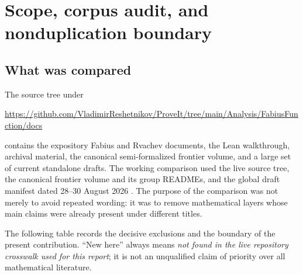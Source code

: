 \documentclass[11pt,a4paper]{article}
\theoremstyle{definition}
\newcommand{\1}{\mathbf{1}}
\begin{document}
\tableofcontents
\newpage

\section{Scope, corpus audit, and nonduplication boundary}
\label{sec:audit}

\subsection{What was compared}

The source tree under
\begin{center}
\url{https://github.com/VladimirReshetnikov/ProveIt/tree/main/Analysis/FabiusFunction/docs}
\end{center}
contains the expository Fabius and Rvachev documents, the Lean walkthrough,
archival material, the canonical semi-formalized frontier volume, and a large
set of current standalone drafts.  The working comparison used the live
source tree, the canonical frontier volume and its group READMEs, and the
global draft manifest dated 28--30 August 2026 \cite{ProveItDocs,ProveItManifest}.  The purpose of the comparison
was not merely to avoid repeated wording: it was to remove mathematical
layers whose main claims were already present under different titles.

The following table records the decisive exclusions and the boundary of the
present contribution.  ``New here'' always means \emph{not found in the live
repository crosswalk used for this report}; it is not an unqualified claim of
priority over all mathematical literature.
\end{document}
